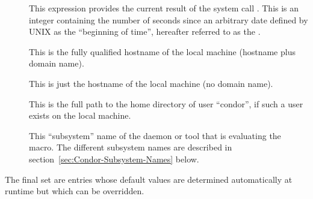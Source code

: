 \begin{description}
  
\item[] \label{param:CurrentTime} This expression
  provides the current result of the system call .  This
  is an integer containing the number of seconds since an arbitrary
  date defined by UNIX as the ``beginning of time'', hereafter
  referred to as the .
  
\item[] \label{param:FullHostname} This is the
  fully qualified hostname of the local machine (hostname plus domain
  name).
  
\item[] \label{param:Hostname} This is just the
  hostname of the local machine (no domain name).
  
\item[] \label{param:Tilde} This is the full path to the
  home directory of user ``condor'', if such a user exists on the
  local machine.

\item[] \label{param:Subsystem} This ``subsystem''
  name of the daemon or tool that is evaluating the macro.  The
  different subsystem names are described in
  section~\ref{sec:Condor-Subsystem-Names} below.

\end{description}

The final set are entries whose default values are determined
automatically at runtime but which can be overridden.  

